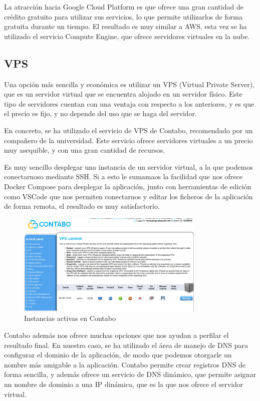 La atracción hacia Google Cloud Platform es que ofrece una gran cantidad de crédito gratuito para utilizar sus servicios, lo que permite utilizarlos de forma gratuita durante un tiempo.
El resultado es muy similar a AWS, esta vez se ha utilizado el servicio Compute Engine, que ofrece servidores virtuales en la nube.


\subsection{VPS}
Una opción más sencilla y económica es utilizar un VPS (Virtual Private Server), que es un servidor virtual que se encuentra alojado en un servidor físico.
Este tipo de servidores cuentan con una ventaja con respecto a los anteriores, y es que el precio es fijo, y no depende del uso que se haga del servidor.

En concreto, se ha utilizado el servicio de VPS de Contabo, recomendado por un compañero de la universidad.
Este servicio ofrece servidores virtuales a un precio muy asequible, y con una gran cantidad de recursos.

Es muy sencillo desplegar una instancia de un servidor virtual, a la que podemos conectarnoso mediante SSH.
Si a esto le sumamaos la facilidad que nos ofrece Docker Compose para desplegar la aplicación, junto con herramientas de edición como VSCode que nos permiten conectarnos y 
editar los ficheros de la aplicación de forma remota, el resultado es muy satisfactorio.

\begin{figure}[htpb]
    \centering
    \includegraphics[width=0.8\textwidth]{cap3/images/contabo-instance.png}
    \caption{Instancias activas en Contabo}
    \label{fig:contabo}
\end{figure}

Contabo además nos ofrece muchas opciones que nos ayudan a perfilar el resultado final.
En nuestro caso, se ha utilizado el área de manejo de DNS para configurar el dominio de la aplicación, de modo que podemos otorgarle un nombre más amigable a la aplicación.
Contabo permite crear registros DNS de forma sencilla, y además ofrece un servicio de DNS dinámico, que permite asignar un nombre de dominio a una IP dinámica, que es la que nos ofrece el servidor virtual.

